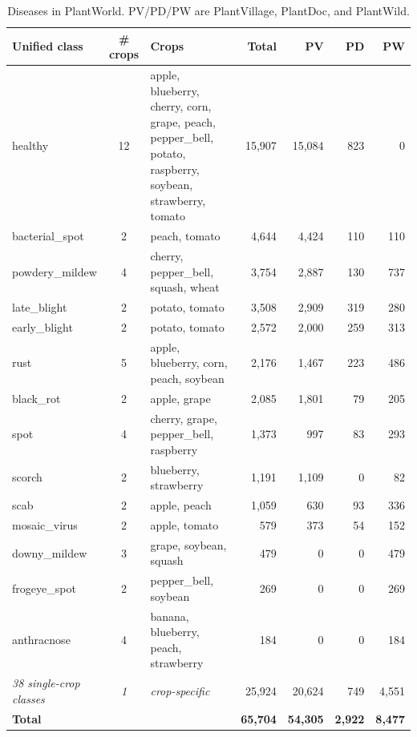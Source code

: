 \documentclass{bmvc2k}
\begin{document}
\begin{table}[h]
\centering
\caption{Diseases in PlantWorld. PV/PD/PW are PlantVillage, PlantDoc, and PlantWild.}
\label{tab:disease_span}
\small
\begin{tabular}{>{\raggedright\arraybackslash}p{2.2cm} c >{\raggedright\arraybackslash}p{3.6cm} r r r r}
\hline
\textbf{Unified class} & \textbf{\# crops} & \textbf{Crops} & \textbf{Total} & \textbf{PV} & \textbf{PD} & \textbf{PW} \\
\hline\hline
healthy         & 12 & apple, blueberry, cherry, corn, grape, peach, pepper\_bell, potato, raspberry, soybean, strawberry, tomato & 15{,}907 & 15{,}084 & 823 & 0 \\
bacterial\_spot & 2  & peach, tomato                                & 4{,}644 & 4{,}424 & 110 & 110 \\
powdery\_mildew & 4  & cherry, pepper\_bell, squash, wheat          & 3{,}754 & 2{,}887 & 130 & 737 \\
late\_blight    & 2  & potato, tomato                               & 3{,}508 & 2{,}909 & 319 & 280 \\
early\_blight   & 2  & potato, tomato                               & 2{,}572 & 2{,}000 & 259 & 313 \\
rust            & 5  & apple, blueberry, corn, peach, soybean       & 2{,}176 & 1{,}467 & 223 & 486 \\
black\_rot      & 2  & apple, grape                                 & 2{,}085 & 1{,}801 & 79  & 205 \\
spot            & 4  & cherry, grape, pepper\_bell, raspberry       & 1{,}373 & 997     & 83  & 293 \\
scorch          & 2  & blueberry, strawberry                        & 1{,}191 & 1{,}109 & 0   & 82 \\
scab            & 2  & apple, peach                                 & 1{,}059 & 630     & 93  & 336 \\
mosaic\_virus   & 2  & apple, tomato                                & 579     & 373     & 54  & 152 \\
downy\_mildew   & 3  & grape, soybean, squash                       & 479     & 0       & 0   & 479 \\
frogeye\_spot   & 2  & pepper\_bell, soybean                        & 269     & 0       & 0   & 269 \\
anthracnose     & 4  & banana, blueberry, peach, strawberry         & 184     & 0       & 0   & 184 \\
\hline
\textit{38 single-crop classes} & \textit{1} & \textit{crop-specific} & 25{,}924 & 20{,}624 & 749 & 4{,}551 \\
\hline
\textbf{Total} & & & \textbf{65{,}704} & \textbf{54{,}305} & \textbf{2{,}922} & \textbf{8{,}477} \\
\hline
\end{tabular}
\end{table}
\end{document}
